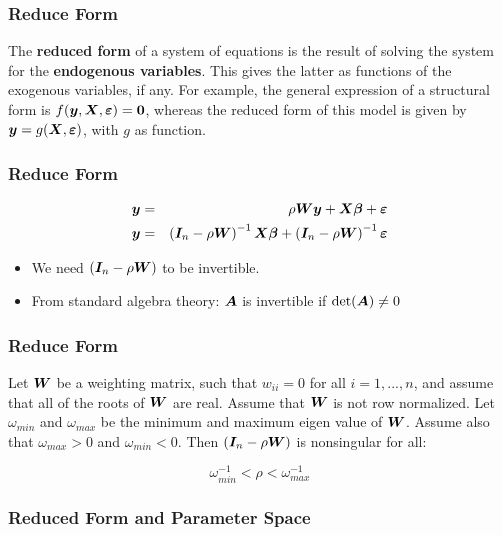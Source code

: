 \documentclass[english,10pt]{beamer}\usepackage[]{graphicx}\usepackage[]{xcolor}
\begin{document}
\begin{frame}
  \frametitle{Reduce Form}
    \begin{alertblock}{}
    The \textbf{reduced form} of a system of equations is the result of solving the system for the \textbf{endogenous variables}. This gives the latter as functions of the exogenous variables, if any. For example, the general expression of a structural form is $f(\bm y, \bm X, \bm {\varepsilon}) = \boldsymbol{0}$, whereas the reduced form of this model is given by $\bm y = g(\bm X, \bm {\varepsilon})$, with $g$ as function. 
    \end{alertblock}
\end{frame}

\begin{frame}
  \frametitle{Reduce Form}
    
    \begin{eqnarray*}
     \bm y &=& \rho \bm W \bm y + \bm X\bm \beta + \bm {\varepsilon} \\
     \bm y &=& \left(\bm I_n - \rho \bm W\right)^{-1}\bm X\bm \beta + \left(\bm I_n - \rho \bm W\right)^{-1}\bm {\varepsilon}
    \end{eqnarray*}

  \begin{itemize}
    \item We need $\left(\bm I_n - \rho \bm W\right)$ to be \alert{invertible}. 
    \item From standard algebra theory: $\bm A$ is invertible if $\det(\bm A)\neq 0$
  \end{itemize}
\end{frame}

\begin{frame}
  \frametitle{Reduce Form}
  \begin{theorem}[Invertibility]
Let $\bm W$ be a weighting matrix, such that $w_{ii} = 0$ for all $i = 1,...,n$, and assume that all of the roots of $\bm W$ are real. Assume that $\bm W$ is not row normalized. Let $\omega_{min}$ and $\omega_{max}$ be the minimum and maximum eigen value of $\bm W$. Assume also that $\omega_{max} > 0$ and $\omega_{min} < 0$. Then $\left(\bm I_n - \rho\bm W\right)$ is nonsingular for all:

\begin{equation*}
  \omega_{min}^{-1} < \rho < \omega_{max}^{-1}
\end{equation*}
\end{theorem}
\end{frame}

\subsubsection{Reduced Form and Parameter Space}
\end{document}

